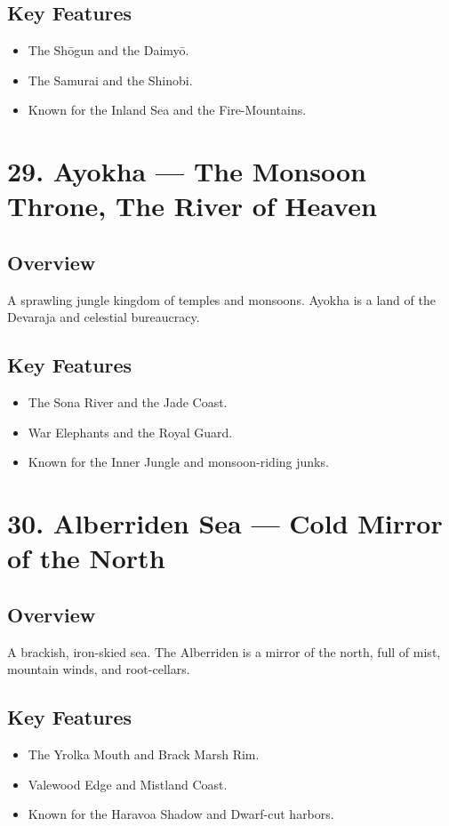 \documentclass[11pt]{article}
\begin{document}
\subsection*{Key Features}
\begin{itemize}[leftmargin=*]
    \item The Shōgun and the Daimyō.
    \item The Samurai and the Shinobi.
    \item Known for the Inland Sea and the Fire-Mountains.
\end{itemize}

\section*{29. Ayokha — The Monsoon Throne, The River of Heaven}

\subsection*{Overview}
A sprawling jungle kingdom of temples and monsoons. Ayokha is a land of the Devaraja and celestial bureaucracy.

\subsection*{Key Features}
\begin{itemize}[leftmargin=*]
    \item The Sona River and the Jade Coast.
    \item War Elephants and the Royal Guard.
    \item Known for the Inner Jungle and monsoon-riding junks.
\end{itemize}

\section*{30. Alberriden Sea — Cold Mirror of the North}

\subsection*{Overview}
A brackish, iron-skied sea. The Alberriden is a mirror of the north, full of mist, mountain winds, and root-cellars.

\subsection*{Key Features}
\begin{itemize}[leftmargin=*]
    \item The Yrolka Mouth and Brack Marsh Rim.
    \item Valewood Edge and Mistland Coast.
    \item Known for the Haravoa Shadow and Dwarf-cut harbors.
\end{itemize}
\end{document}
